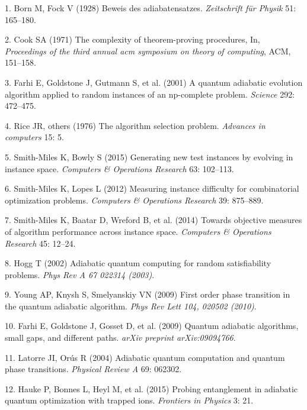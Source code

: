 \documentclass[
]{article}
\begin{document}
\small

\hypertarget{refs}{}
\leavevmode\hypertarget{ref-Born1928}{}%
1. Born M, Fock V (1928) Beweis des adiabatensatzes. \emph{Zeitschrift
für Physik} 51: 165--180.

\leavevmode\hypertarget{ref-Cook1971}{}%
2. Cook SA (1971) The complexity of theorem-proving procedures, In,
\emph{Proceedings of the third annual acm symposium on theory of
computing}, ACM, 151--158.

\leavevmode\hypertarget{ref-Farhi2001}{}%
3. Farhi E, Goldstone J, Gutmann S, et al. (2001) A quantum adiabatic
evolution algorithm applied to random instances of an np-complete
problem. \emph{Science} 292: 472--475.

\leavevmode\hypertarget{ref-Rice1976}{}%
4. Rice JR, others (1976) The algorithm selection problem.
\emph{Advances in computers} 15: 5.

\leavevmode\hypertarget{ref-Smith-Miles2015}{}%
5. Smith-Miles K, Bowly S (2015) Generating new test instances by
evolving in instance space. \emph{Computers \& Operations Research} 63:
102--113.

\leavevmode\hypertarget{ref-Smith-Miles2012}{}%
6. Smith-Miles K, Lopes L (2012) Measuring instance difficulty for
combinatorial optimization problems. \emph{Computers \& Operations
Research} 39: 875--889.

\leavevmode\hypertarget{ref-Smith-Miles2014}{}%
7. Smith-Miles K, Baatar D, Wreford B, et al. (2014) Towards objective
measures of algorithm performance across instance space. \emph{Computers
\& Operations Research} 45: 12--24.

\leavevmode\hypertarget{ref-Hogg2002}{}%
8. Hogg T (2002) Adiabatic quantum computing for random satisfiability
problems. \emph{Phys Rev A 67 022314 (2003)}.

\leavevmode\hypertarget{ref-Young2009}{}%
9. Young AP, Knysh S, Smelyanskiy VN (2009) First order phase transition
in the quantum adiabatic algorithm. \emph{Phys Rev Lett 104, 020502
(2010)}.

\leavevmode\hypertarget{ref-Farhi2009}{}%
10. Farhi E, Goldstone J, Gosset D, et al. (2009) Quantum adiabatic
algorithms, small gaps, and different paths. \emph{arXiv preprint
arXiv:09094766}.

\leavevmode\hypertarget{ref-Latorre2004}{}%
11. Latorre JI, Orús R (2004) Adiabatic quantum computation and quantum
phase transitions. \emph{Physical Review A} 69: 062302.

\leavevmode\hypertarget{ref-Hauke2015}{}%
12. Hauke P, Bonnes L, Heyl M, et al. (2015) Probing entanglement in
adiabatic quantum optimization with trapped ions. \emph{Frontiers in
Physics} 3: 21.
\end{document}
